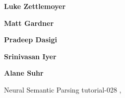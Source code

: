 \begin{bio}
  {\bfseries Luke Zettlemoyer} 

  {\bfseries Matt Gardner}
 
  {\bfseries Pradeep Dasigi}

  {\bfseries Srinivasan Iyer}

  {\bfseries Alane Suhr}

\end{bio}

\begin{tutorial}
  {Neural Semantic Parsing}
  {tutorial-028}
  {\daydateyear, \tutorialafternoontime}
  {\TutLocF}

\end{tutorial} 
